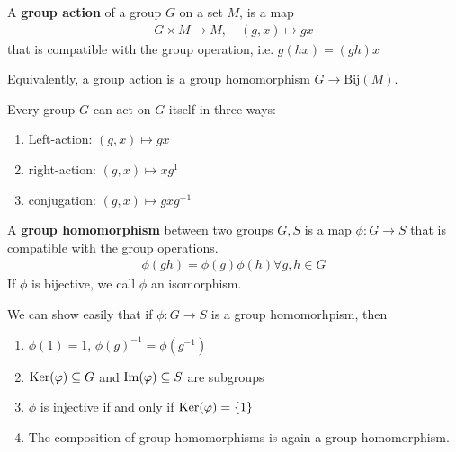 \begin{dfn}[]
  A \textbf{group action} of a group $G$ on a set $M$, is a map
  \begin{align*}
    G \times M \to  M, \quad (g,x) \mapsto  gx
  \end{align*}
  that is compatible with the group operation, i.e. $g(hx) = (gh)x$

  Equivalently, a group action is a group homomorphism $G \to \text{Bij}(M)$.
\end{dfn}
Every group $G$ can act on $G$ itself in three ways:
\begin{enumerate}
  \item Left-action: $(g,x) \mapsto gx$
  \item right-action: $(g,x) \mapsto xg^{1}$
  \item conjugation: $(g,x) \mapsto gxg^{-1}$
\end{enumerate}

\begin{dfn}[]
A \textbf{group homomorphism} between two groups $G,S$ is a map $\phi: G \to S$ that is compatible with the group operations.
\begin{align*}
  \phi(gh) = \phi(g) \phi(h) \forall g,h \in G
\end{align*}
If $\phi$ is bijective, we call $\phi$ an isomorphism.
\end{dfn}
We can show easily that if $\phi: G \to S$ is a group homomorhpism, then
\begin{enumerate}
  \item $\phi(1) = 1$, $\phi(g)^{-1} = \phi(g^{-1})$
  \item $\operatorname{Ker}(\varphi) \subseteq G$ and $\operatorname{Im}(\varphi) \subseteq S$ are subgroups
\item $\phi$ is injective if and only if $\operatorname{Ker}(\varphi) = \{1\}$
  \item The composition of group homomorphisms is again a group homomorphism.
\end{enumerate}

